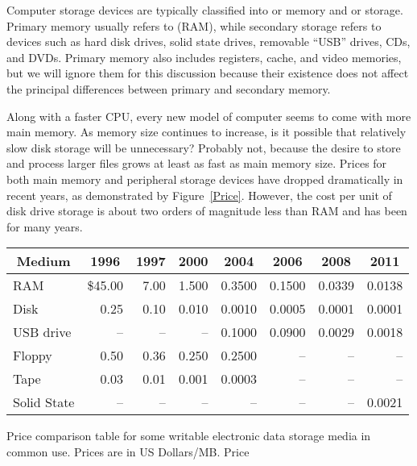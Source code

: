 Computer storage devices are typically classified into 
or  memory and
 or  storage.
Primary memory usually refers to 
(RAM),
while secondary storage refers to devices such as
hard disk drives, solid state drives, removable ``USB'' drives,
CDs, and DVDs.
Primary memory also includes registers, cache, and video memories,
but we will ignore them for this discussion because their existence
does not affect the principal differences between primary and
secondary memory.

Along with a faster CPU, every new model of computer seems to come
with more main memory.
As memory size continues to increase, is it possible that
relatively slow disk storage will be unnecessary?
Probably not, because the desire to store and process larger files
grows at least as fast as main memory size.
Prices for both main memory and peripheral storage devices have
dropped dramatically in recent years, as demonstrated by
Figure~\ref{Price}.
However, the cost per unit of disk drive storage is about two
orders of magnitude less than RAM and has been for
many years.

\begin{mytable}
\begin{center}
\begin{tabular}{l|r|r|r|r|r|r|r}
\hline
\multicolumn{1}{c|}{\textbf{Medium}}&
\multicolumn{1}{c|}{\textbf{1996}}&
\multicolumn{1}{c|}{\textbf{1997}}&
\multicolumn{1}{c|}{\textbf{2000}}&
\multicolumn{1}{c|}{\textbf{2004}}&
\multicolumn{1}{c|}{\textbf{2006}}&
\multicolumn{1}{c}{\textbf{2008}}&
\multicolumn{1}{c}{\textbf{2011}}
\\
\hline
RAM&    \$45.00 & 7.00 & 1.500 & 0.3500 & 0.1500 & 0.0339 & 0.0138\\
Disk&      0.25 & 0.10 & 0.010 & 0.0010 & 0.0005 & 0.0001 & 0.0001\\
USB drive& -- & --   & --    & 0.1000 & 0.0900 & 0.0029 & 0.0018\\
Floppy&    0.50 & 0.36 & 0.250 & 0.2500 & -- & -- & --\\
Tape&      0.03 & 0.01 & 0.001 & 0.0003 & -- & -- & --\\
Solid State& -- & --   &  --   &  --    & -- & -- & 0.0021\\
\hline
\end{tabular}
\end{center}
\vspace{-\medskipamount}

{Price comparison table for some writable electronic data storage
media in common use.
Prices are in US Dollars/MB.}
{Price}
\smallskip
\end{mytable}

